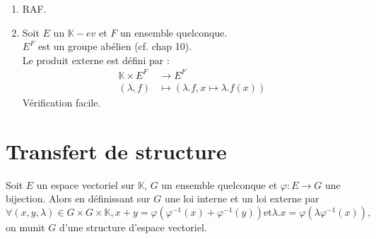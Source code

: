 \documentclass[../main.tex]{subfiles}
\begin{document}
\begin{enumerate}
    \item RAF. 
    \item Soit $E$ un $\mathbb{K}-ev$ et $F$ un ensemble quelconque. \\
    $E^F$ est un groupe abélien (cf. chap 10). \\
    Le produit externe est défini par : 
    \begin{align*}
        \mathbb{K} \times E^F &\longrightarrow E^F \\
        (\lambda, f) &\longmapsto (\lambda.f, x \mapsto \lambda.f(x))
    \end{align*}
    Vérification facile. 
\end{enumerate}

\section{Transfert de structure}
\begin{tcolorbox}[title=Lemme 20.11, title filled=false, colframe=orange, colback=orange!10!white]
    Soit $E$ un espace vectoriel sur $\mathbb{K}$, $G$ un ensemble quelconque et $\varphi:E\to G$ une bijection. Alors en définissant sur $G$ une loi interne et un loi externe par
    $$\forall (x, y, \lambda) \in G \times G \times \mathbb{K}, x + y = \varphi(\varphi^{-1}(x) + \varphi^{-1}(y)) \text{et} \lambda.x = \varphi(\lambda \varphi^{-1}(x)),$$
    on munit $G$ d'une structure d'espace vectoriel. 
\end{tcolorbox}
\end{document}
